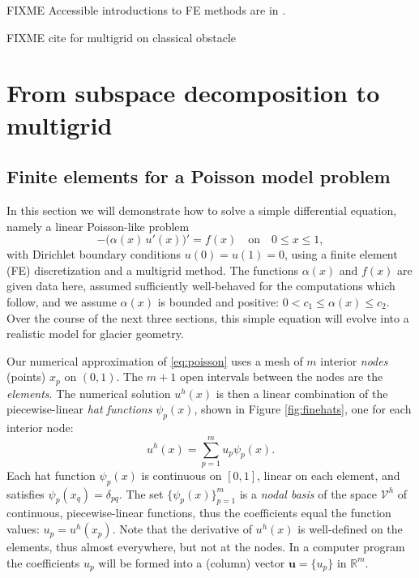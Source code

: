 \documentclass[letterpaper,final,12pt,reqno]{amsart}
\theoremstyle{claim}
\newcommand{\RR}{\mathbb{R}}
\newcommand{\bu}{\mathbf{u}}
\numberwithin{equation}{section}
\numberwithin{figure}{section}
\numberwithin{table}{section}
\numberwithin{theorem}{section}
\begin{document}
FIXME Accessible introductions to FE methods are in \cite{Bueler2021,Elmanetal2014,Johnson2009}.

FIXME cite for multigrid on classical obstacle \cite{BrandtCryer1983,Bueler2021,GraeserKornhuber2009}


\section{From subspace decomposition to multigrid} \label{sec:subspace}

\subsection*{Finite elements for a Poisson model problem}  In this section we will demonstrate how to solve a simple differential equation, namely a linear Poisson-like problem
\begin{equation}
- \big(\alpha(x)\,u'(x)\big)' = f(x) \quad \text{on} \quad 0 \le x \le 1, \label{eq:poisson}
\end{equation}
with Dirichlet boundary conditions $u(0)=u(1)=0$, using a finite element (FE) discretization and a multigrid method.  The functions $\alpha(x)$ and $f(x)$ are given data here, assumed sufficiently well-behaved for the computations which follow, and we assume $\alpha(x)$ is bounded and positive: $0 < c_1 \le \alpha(x) \le c_2$.  Over the course of the next three sections, this simple equation will evolve into a realistic model for glacier geometry.

Our numerical approximation of \eqref{eq:poisson} uses a mesh of $m$ interior \emph{nodes} (points) $x_p$ on $(0,1)$.  The $m+1$ open intervals between the nodes are the \emph{elements}.  The numerical solution $u^h(x)$ is then a linear combination of the piecewise-linear \emph{hat functions} $\psi_p(x)$, shown in Figure \ref{fig:finehats}, one for each interior node:
\begin{equation}
u^h(x) = \sum_{p=1}^m u_p \psi_p(x). \label{eq:trialsolution}
\end{equation}
Each hat function $\psi_p(x)$ is continuous on $[0,1]$, linear on each element, and satisfies $\psi_p(x_q) = \delta_{pq}$.  The set $\{\psi_p(x)\}_{p=1}^m$ is a \emph{nodal basis} of the space $\mathcal{V}^h$ of continuous, piecewise-linear functions, thus the coefficients equal the function values: $u_p=u^h(x_p)$.  Note that the derivative of $u^h(x)$ is well-defined on the elements, thus almost everywhere, but not at the nodes.  In a computer program the coefficients $u_p$ will be formed into a (column) vector $\bu=\{u_p\}$ in $\RR^m$.
\end{document}
